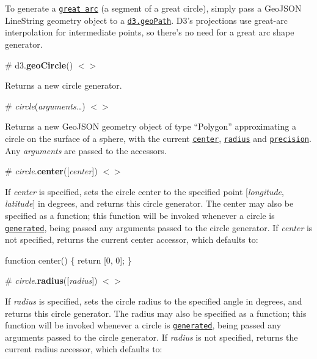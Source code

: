 To generate a \href{https://en.wikipedia.org/wiki/Great-circle_distance}{\tt great arc} (a segment of a great circle), simply pass a Geo\+J\+S\+ON Line\+String geometry object to a \href{#geoPath}{\tt d3.\+geo\+Path}. D3’s projections use great-\/arc interpolation for intermediate points, so there’s no need for a great arc shape generator.

\label{_geoCircle}%
\# d3.{\bfseries geo\+Circle}() \href{https://github.com/d3/d3-geo/blob/master/src/circle.js}{\tt $<$$>$}

Returns a new circle generator.

\label{__circle}%
\# {\itshape circle}({\itshape arguments…}) \href{https://github.com/d3/d3-geo/blob/master/src/circle.js#L47}{\tt $<$$>$}

Returns a new Geo\+J\+S\+ON geometry object of type “\+Polygon” approximating a circle on the surface of a sphere, with the current \href{#circle_center}{\tt center}, \href{#circle_radius}{\tt radius} and \href{#circle_precision}{\tt precision}. Any {\itshape arguments} are passed to the accessors.

\label{_circle_center}%
\# {\itshape circle}.{\bfseries center}(\mbox{[}{\itshape center}\mbox{]}) \href{https://github.com/d3/d3-geo/blob/master/src/circle.js#L59}{\tt $<$$>$}

If {\itshape center} is specified, sets the circle center to the specified point \mbox{[}{\itshape longitude}, {\itshape latitude}\mbox{]} in degrees, and returns this circle generator. The center may also be specified as a function; this function will be invoked whenever a circle is \href{#_circle}{\tt generated}, being passed any arguments passed to the circle generator. If {\itshape center} is not specified, returns the current center accessor, which defaults to\+:


\begin{DoxyCode}
function center() \{
  return [0, 0];
\}
\end{DoxyCode}


\label{_circle_radius}%
\# {\itshape circle}.{\bfseries radius}(\mbox{[}{\itshape radius}\mbox{]}) \href{https://github.com/d3/d3-geo/blob/master/src/circle.js#L63}{\tt $<$$>$}

If {\itshape radius} is specified, sets the circle radius to the specified angle in degrees, and returns this circle generator. The radius may also be specified as a function; this function will be invoked whenever a circle is \href{#_circle}{\tt generated}, being passed any arguments passed to the circle generator. If {\itshape radius} is not specified, returns the current radius accessor, which defaults to\+:


